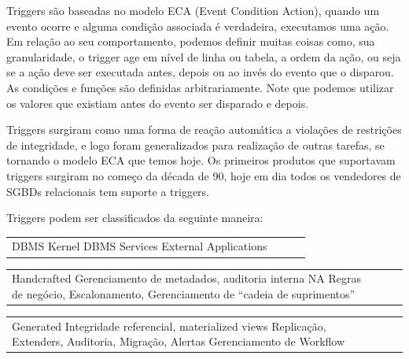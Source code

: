 \documentclass[conference]{IEEEtran}
\begin{document}
    Triggers são baseadas no modelo ECA (Event Condition Action), quando um evento ocorre e alguma condição associada é verdadeira, executamos uma ação. Em relação ao seu comportamento, podemos definir muitas coisas como, sua granularidade, o trigger age em nível de linha ou tabela, a ordem da ação, ou seja se a ação deve ser executada antes, depois ou ao invés do evento que o disparou. As condições e funções são definidas arbitrariamente. Note que podemos utilizar os valores que existiam antes do evento ser disparado e depois.

    Triggers surgiram como uma forma de reação automática a violações de restrições de integridade, e logo foram generalizados para realização de outras tarefas, se tornando o modelo ECA que temos hoje. Os primeiros produtos que suportavam triggers surgiram no começo da década de 90, hoje em dia todos os vendedores de SGBDs relacionais tem suporte a triggers.

    Triggers podem ser classificados da seguinte maneira:

    \begin{table}[H]
        \begin{tabular}{p{8cm}p{8cm}p{8cm}p{8cm}}
            \vspace{0pt}
            \vspace{0pt}
             DBMS Kernel
            \vspace{0pt}
            DBMS Services
            \vspace{0pt}
            External Applications
        \end{tabular}
        \begin{tabular}{p{8cm}p{8cm}p{8cm}p{8cm}}
            \vspace{0pt}
            Handcrafted
            \vspace{0pt}
            Gerenciamento de metadados, auditoria interna
            \vspace{0pt}
            NA
            \vspace{0pt}
            Regras de negócio, Escalonamento, Gerenciamento de “cadeia de suprimentos”
        \end{tabular}
        \begin{tabular}{p{8cm}p{8cm}p{8cm}p{8cm}}
            \vspace{0pt}
            Generated
            \vspace{0pt}
            Integridade referencial, materialized views
            \vspace{0pt}
            Replicação, Extenders, Auditoria, Migração, Alertas
            \vspace{0pt}
            Gerenciamento de Workflow
        \end{tabular}
    \end{table}
\end{document}
